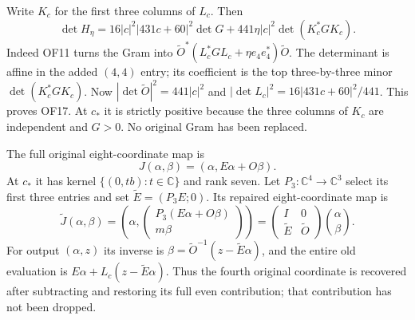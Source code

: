 \documentclass[11pt]{article}
\newcommand{\C}{\mathbb C}
\begin{document}
Write $K_c$ for the first three columns of $L_c$. Then
\begin{equation}
 \det H_\eta=16|c|^2|431c+60|^2\det G
       +441\eta|c|^2\det(K_c^*GK_c).\tag{OF17}
\end{equation}
Indeed OF11 turns the Gram into
$\widetilde O^*(L_c^*GL_c+\eta e_4e_4^*)\widetilde O$.
The determinant is affine in the added $(4,4)$ entry; its
coefficient is the top three-by-three minor $\det(K_c^*GK_c)$.
Now $|\det\widetilde O|^2=441|c|^2$ and
$|\det L_c|^2=16|431c+60|^2/441$. This proves OF17.
At $c_*$ it is strictly positive because the three columns of $K_c$
are independent and $G>0$. No original Gram has been replaced.

The full original eight-coordinate map is
\begin{equation}
 J(\alpha,\beta)=(\alpha,E\alpha+O\beta).
 \tag{OF18}
\end{equation}
At $c_*$ it has kernel $\{(0,tb):t\in\C\}$ and rank seven.
Let $P_3:\C^4\to\C^3$ select its first three entries and set
$\widetilde E=(P_3E;0)$. Its repaired eight-coordinate map is
\begin{equation}
 \widetilde J(\alpha,\beta)
 =\left(\alpha,\begin{pmatrix}P_3(E\alpha+O\beta)\\m\beta\end{pmatrix}\right)
 =\begin{pmatrix}I&0\\\widetilde E&\widetilde O\end{pmatrix}
   \binom\alpha\beta.\tag{OF19}
\end{equation}
For output $(\alpha,z)$ its inverse is
$\beta=\widetilde O^{-1}(z-\widetilde E\alpha)$, and the entire
old evaluation is $E\alpha+L_c(z-\widetilde E\alpha)$.
Thus the fourth original coordinate is recovered after subtracting
and restoring its full even contribution; that contribution has
not been dropped.
\end{document}

